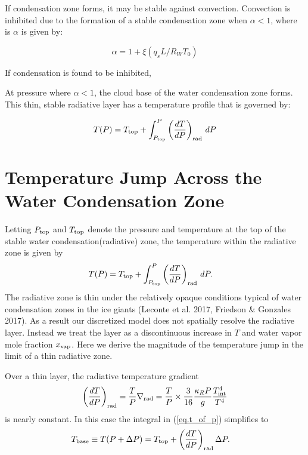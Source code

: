\documentclass[11pt]{ucscthesisbs}
\begin{document}
If condensation zone forms, it may be stable against convection. Convection is inhibited due to the formation of a stable condensation zone when $\alpha < 1$, where is $\alpha$ \citep{friedson_2017} is given by:

\begin{equation}
  \alpha = 1 + \xi (q_{s} L / R_{W} T_{0}) 
\end{equation}

If condensation is found to be inhibited,  

At pressure where $\alpha < 1$, the cloud base of the water condensation zone forms. This thin, stable radiative layer has a temperature profile that is governed by:

\begin{equation}
	T(P) = T_{\rm top} + \int_{P_{\rm top}}^P\left(\frac{dT}{dP}\right)_{\rm rad}\,d P
\end{equation}

\section{Temperature Jump Across the Water Condensation Zone}
Letting $P_{\rm top}$ and $T_{\rm top}$ denote the pressure and temperature at the top of the stable water condensation(radiative) zone, the temperature within the radiative zone is given by
\begin{align}
T(P) &= T_{\rm top} + \int_{P_{\rm top}}^P\left(\frac{dT}{dP}\right)_{\rm rad}\,d P. \label{eq.t_of_p}
\end{align}
The radiative zone is thin under the relatively opaque conditions typical of water condensation zones in the ice giants (Leconte et al. 2017, Friedson \& Gonzales 2017). As a result our discretized model does not spatially resolve the radiative layer. Instead we treat the layer as a discontinuous increase in $T$ and water vapor mole fraction $x_{\rm vap}$. Here we derive the magnitude of the temperature jump in the limit of a thin radiative zone.

Over a thin layer, the radiative temperature gradient
\begin{align}
  \left(\frac{dT}{dP}\right)_{\rm rad}=\frac{T}{P}\nabla_{\rm rad}
  = \frac{T}{P}\times\frac{3}{16}\frac{\kappa_R P}{g}\frac{T_{\rm int}^4}{T^4}
\end{align}
is nearly constant. In this case the integral in (\ref{eq.t_of_p}) simplifies to
\begin{align}
T_{\rm base}\equiv T(P+\Delta P) &= T_{\rm top} + \left(\frac{dT}{dP}\right)_{\rm rad}\Delta P.\label{eq.t1}
\end{align}
\end{document}
